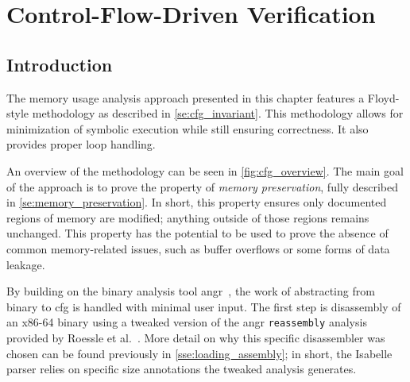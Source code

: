 \chapter{Control-Flow-Driven Verification}\label{ch:cfg}

\section{Introduction}\label{se:cfg_intro}
The memory usage analysis approach presented in this chapter
features a Floyd-style methodology as described in \cref{se:cfg_invariant}.
This methodology allows for minimization of symbolic execution
 while still ensuring correctness.
It also provides proper loop handling.

An overview of the methodology can be seen in \cref{fig:cfg_overview}.
The main goal of the approach is to prove the property of \emph{memory preservation},
fully described in \cref{se:memory_preservation}.
In short, this property ensures only documented regions of memory are modified;
anything outside of those regions remains unchanged.
This property has the potential to be used
to prove the absence of common memory-related issues,
such as buffer overflows or some forms of data leakage.

By building on the binary analysis tool angr~\citep{shoshitaishvili2016state},
the work of abstracting from binary to \ac{cfg} is handled with minimal user input.
The first step is disassembly of an x86-64 binary using
a tweaked version of the angr
\lstinline|reassembly| analysis~\citep{wang2017ramblr}
provided by Roessle et al.~\citep{roessle2019}.
More detail on why this specific disassembler was chosen
can be found previously in \cref{sse:loading_assembly}; in short,
the Isabelle parser relies on specific size annotations the tweaked analysis generates.

